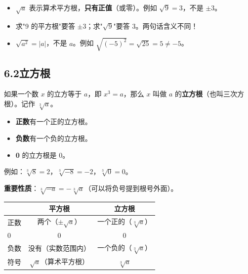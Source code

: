 \documentclass[12pt, a4paper]{ctexart}
\begin{document}
\begin{warnbox}[易错提醒]
\begin{itemize}[leftmargin=2em]
  \item $\sqrt{a}$ 表示算术平方根，\textbf{只有正值}（或零）。例如 $\sqrt{9} = 3$，不是 $\pm 3$。
  \item 求"9 的平方根"要答 $\pm 3$；求"$\sqrt{9}$"要答 $3$。两句话含义不同！
  \item $\sqrt{a^2} = |a|$，不是 $a$。例如 $\sqrt{(-5)^2} = \sqrt{25} = 5 \neq -5$。
\end{itemize}
\end{warnbox}

\subsection*{6.2\quad 立方根}

\begin{knowledgebox}
如果一个数 $x$ 的立方等于 $a$，即 $x^3 = a$，那么 $x$ 叫做 $a$ 的\textbf{立方根}（也叫三次方根）。记作 $\sqrt[3]{a}$。

\begin{itemize}[leftmargin=2em]
  \item \textbf{正数}有一个正的立方根。
  \item \textbf{负数}有一个负的立方根。
  \item \textbf{0} 的立方根是 0。
\end{itemize}

例如：$\sqrt[3]{8} = 2$，$\sqrt[3]{-8} = -2$，$\sqrt[3]{0} = 0$。

\textbf{重要性质}：$\sqrt[3]{-a} = -\sqrt[3]{a}$（可以将负号提到根号外面）。
\end{knowledgebox}

\begin{tipbox}[平方根与立方根的对比]
\begin{center}
\renewcommand{\arraystretch}{1.4}
\begin{tabular}{lcc}
\toprule
 & \textbf{平方根} & \textbf{立方根} \\
\midrule
正数 & 两个（$\pm\sqrt{a}$） & 一个正的（$\sqrt[3]{a}$） \\
0   & 0 & 0 \\
负数 & 没有（实数范围内） & 一个负的（$\sqrt[3]{a}$） \\
符号 & $\sqrt{a}$（算术平方根） & $\sqrt[3]{a}$ \\
\bottomrule
\end{tabular}
\end{center}
\end{tipbox}
\end{document}
